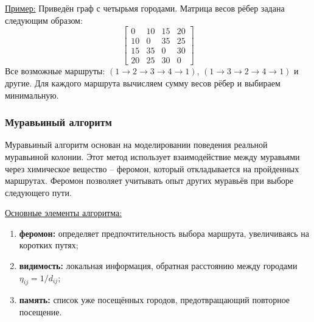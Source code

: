 \underline{Пример:}
Приведён граф с четырьмя городами. Матрица весов рёбер задана следующим образом:
\begin{equation*}
\begin{bmatrix}
    0 & 10 & 15 & 20 \\
    10 & 0 & 35 & 25 \\
    15 & 35 & 0 & 30 \\
    20 & 25 & 30 & 0
\end{bmatrix}
\end{equation*}
Все возможные маршруты: $(1 \to 2 \to 3 \to 4 \to 1)$, $(1 \to 3 \to 2 \to 4 \to 1)$ и другие. Для каждого маршрута вычисляем сумму весов рёбер и выбираем минимальную.


\subsubsection{Муравьиный алгоритм}

\hspace{1.25cm}
Муравьиный алгоритм основан на моделировании поведения реальной муравьиной колонии. Этот метод использует взаимодействие между муравьями через химическое вещество -- феромон, который откладывается на пройденных маршрутах. Феромон позволяет учитывать опыт других муравьёв при выборе следующего пути.

\underline{Основные элементы алгоритма:}
\begin{enumerate}[label=\arabic*)]
    \item \textbf{феромон:} определяет предпочтительность выбора маршрута, увеличиваясь на коротких путях;
    \item \textbf{видимость:} локальная информация, обратная расстоянию между городами $\eta_{ij} = 1 / d_{ij}$;
    \item \textbf{память:} список уже посещённых городов, предотвращающий повторное посещение.
\end{enumerate}


